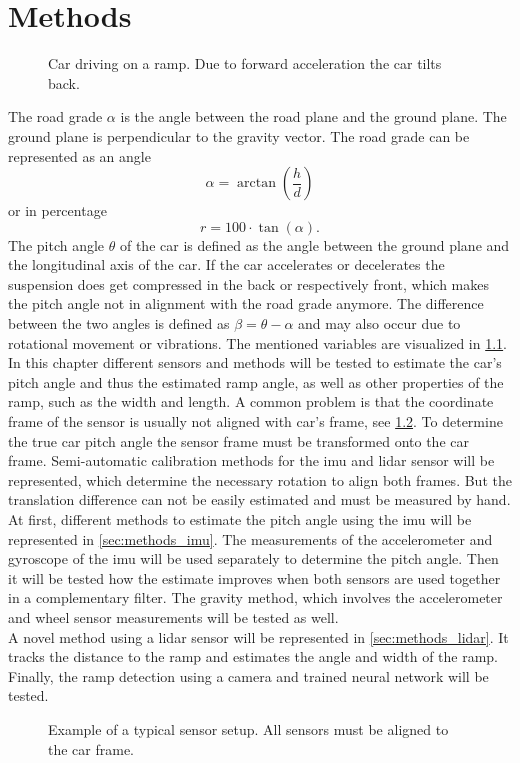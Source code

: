 \chapter{Methods}
\label{ch:Methods}
\begin{figure}[htpb]
	\centering
	
	\caption{Car driving on a ramp. Due to forward acceleration the car tilts back.}
	\label{fig:tikz_car_tilt}
\end{figure}
The road grade $\alpha$ is the angle between the road plane and the ground plane.
The ground plane is perpendicular to the gravity vector.
The road grade can be represented as an angle
\begin{equation}
	\alpha = \arctan(\frac{h}{d})
\end{equation}
or in percentage
\begin{equation}
	r = 100\cdot\tan(\alpha).
\end{equation}
The pitch angle $\theta$ of the car is defined as the angle between the ground plane and the longitudinal axis of the car.
If the car accelerates or decelerates the suspension does get compressed in the back or respectively front, which makes the pitch angle not in alignment with the road grade anymore.
The difference between the two angles is defined as $\beta = \theta - \alpha$ and may also occur due to rotational movement or vibrations.
The mentioned variables are visualized in \cref{fig:tikz_car_tilt}.\\
In this chapter different sensors and methods will be tested to estimate the car's pitch angle and thus the estimated ramp angle, as well as other properties of the ramp, such as the width and length.
A common problem is that the coordinate frame of the sensor is usually not aligned with car's frame, see \cref{fig:tikz_car_frames}.
To determine the true car pitch angle the sensor frame must be transformed onto the car frame.
Semi-automatic calibration methods for the \gls{imu} and \gls{lidar} sensor will be represented, which determine the necessary rotation to align both frames.
But the translation difference can not be easily estimated and must be measured by hand.\\
At first, different methods to estimate the pitch angle using the \gls{imu} will be represented in \cref{sec:methods_imu}.
The measurements of the accelerometer and gyroscope of the \gls{imu} will be used separately to determine the pitch angle.
Then it will be tested how the estimate improves when both sensors are used together in a complementary filter.
The gravity method, which involves the accelerometer and wheel sensor measurements will be tested as well.\\
A novel method using a \gls{lidar} sensor will be represented in \cref{sec:methods_lidar}.
It tracks the distance to the ramp and estimates the angle and width of the ramp.
Finally, the ramp detection using a camera and trained neural network will be tested.
\begin{figure}[htpb]
	\centering
	
	\caption{Example of a typical sensor setup. All sensors must be aligned to the car frame.}
	\label{fig:tikz_car_frames}
\end{figure}



